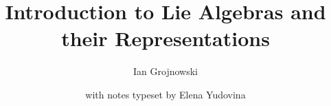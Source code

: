 \documentclass[11pt,a4paper]{article}
\title{Introduction to Lie Algebras and their Representations}
\author[a]{Ian Grojnowski}
\author[b]{with notes typeset by Elena Yudovina}
\affiliation[a]{DPMMS, University of Cambridge}
\affiliation[b]{Statistical Laboratory, University of Cambridge}
\theoremstyle{plain}
\theoremstyle{definition}
\theoremstyle{remark}
\begin{document}
\maketitle
\flushbottom











\end{document}
